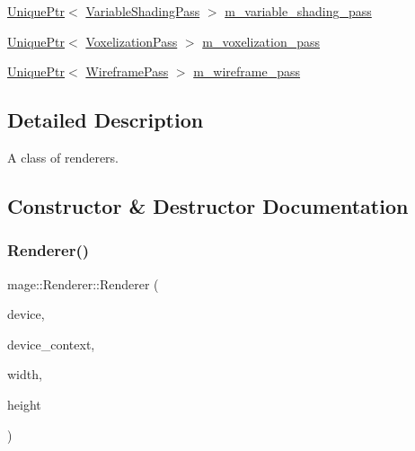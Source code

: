 \begin{DoxyCompactItemize}
\hyperlink{namespacemage_a3316d7143a973e37adf1110f2e80ca31}{Unique\+Ptr}$<$ \hyperlink{classmage_1_1_variable_shading_pass}{Variable\+Shading\+Pass} $>$ \hyperlink{classmage_1_1_renderer_adb0d48e33a86c3ee481b26165e416487}{m\+\_\+variable\+\_\+shading\+\_\+pass}
\item 
\hyperlink{namespacemage_a3316d7143a973e37adf1110f2e80ca31}{Unique\+Ptr}$<$ \hyperlink{classmage_1_1_voxelization_pass}{Voxelization\+Pass} $>$ \hyperlink{classmage_1_1_renderer_a763f835f495bb7784a71c95178755dc4}{m\+\_\+voxelization\+\_\+pass}
\item 
\hyperlink{namespacemage_a3316d7143a973e37adf1110f2e80ca31}{Unique\+Ptr}$<$ \hyperlink{classmage_1_1_wireframe_pass}{Wireframe\+Pass} $>$ \hyperlink{classmage_1_1_renderer_a8c9f28228031337e26725af8213268ed}{m\+\_\+wireframe\+\_\+pass}
\end{DoxyCompactItemize}


\subsection{Detailed Description}
A class of renderers. 

\subsection{Constructor \& Destructor Documentation}
\hypertarget{classmage_1_1_renderer_a4efd88a30f3ad43cf5d490d62259f921}{}\label{classmage_1_1_renderer_a4efd88a30f3ad43cf5d490d62259f921} 
\subsubsection{\texorpdfstring{Renderer()}{Renderer()}\hspace{0.1cm}{\footnotesize\ttfamily [1/3]}}
{\footnotesize\ttfamily mage\+::\+Renderer\+::\+Renderer (\begin{DoxyParamCaption}\item[{I\+D3\+D11\+Device5 $\ast$}]{device,  }\item[{I\+D3\+D11\+Device\+Context4 $\ast$}]{device\+\_\+context,  }\item[{\hyperlink{namespacemage_a41c104c036fba3756a74e19f793eeaa1}{U32}}]{width,  }\item[{\hyperlink{namespacemage_a41c104c036fba3756a74e19f793eeaa1}{U32}}]{height }\end{DoxyParamCaption})\hspace{0.3cm}{\ttfamily [explicit]}}

